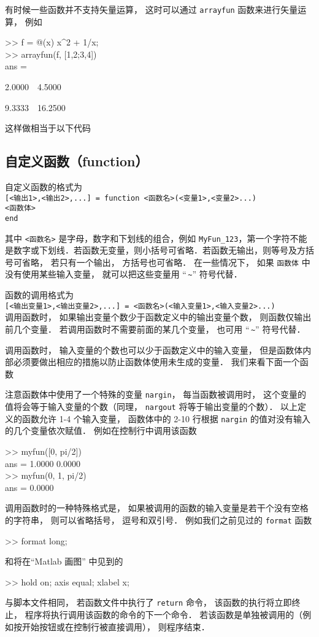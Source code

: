 有时候一些函数并不支持矢量运算， 这时可以通过 \texttt{arrayfun} 函数来进行矢量运算， 例如
\begin{Command}
>> f = @(x) x\^{}2 + 1/x;\\
>> arrayfun(f, [1,2;3,4])\\
ans = \par
2.0000\ \ 4.5000\par
9.3333\ \ 16.2500
\end{Command}
这样做相当于以下代码


\subsection{自定义函数（function）}
自定义函数的格式为\\
\texttt{[<输出1>,<输出2>,...] = function <函数名>(<变量1>,<变量2>...)}\\
\texttt{<函数体>}\\
\texttt{end}

其中 \texttt{<函数名>} 是字母，数字和下划线的组合，例如 \texttt{MyFun\_123}，第一个字符不能是数字或下划线．若函数无变量，则小括号可省略．若函数无输出，则等号及方括号可省略， 若只有一个输出， 方括号也可省略． 在一些情况下， 如果 \texttt{函数体} 中没有使用某些输入变量， 就可以把这些变量用 “\;\,\texttt{\~}” 符号代替．

函数的调用格式为\\
\texttt{[<输出变量1>,<输出变量2>,...] = <函数名>(<输入变量1>,<输入变量2>...)}\\
调用函数时， 如果输出变量个数少于函数定义中的输出变量个数， 则函数仅输出前几个变量． 若调用函数时不需要前面的某几个变量， 也可用 “\;\,\texttt{\~}” 符号代替．

调用函数时， 输入变量的个数也可以少于函数定义中的输入变量， 但是函数体内部必须要做出相应的措施以防止函数体使用未生成的变量． 我们来看下面一个函数

注意函数体中使用了一个特殊的变量 \texttt{nargin}， 每当函数被调用时， 这个变量的值将会等于输入变量的个数（同理， \texttt{nargout} 将等于输出变量的个数）． 以上定义的函数允许 1-4 个输入变量， 函数体中的 2-10 行根据 \texttt{nargin} 的值对没有输入的几个变量依次赋值． 例如在控制行中调用该函数
\begin{Command}
>> myfun([0, pi/2])\\
ans = 1.0000    0.0000\\
>> myfun(0, 1, pi/2)\\
ans = 0.0000
\end{Command}

调用函数时的一种特殊格式是， 如果被调用的函数的输入变量是若干个没有空格的字符串， 则可以省略括号， 逗号和双引号． 例如我们之前见过的 \texttt{format} 函数
\begin{Command}
>> format {\color{string}long};
\end{Command}
和将在“Matlab 画图” 中见到的
\begin{Command}
>> hold {\color{string}on}; axis {\color{string}equal}; xlabel {\color{string}x};
\end{Command}

与脚本文件相同， 若函数文件中执行了 \texttt{return} 命令， 该函数的执行将立即终止， 程序将执行调用该函数的命令的下一个命令． 若该函数是单独被调用的（例如按开始按钮或在控制行被直接调用）， 则程序结束．